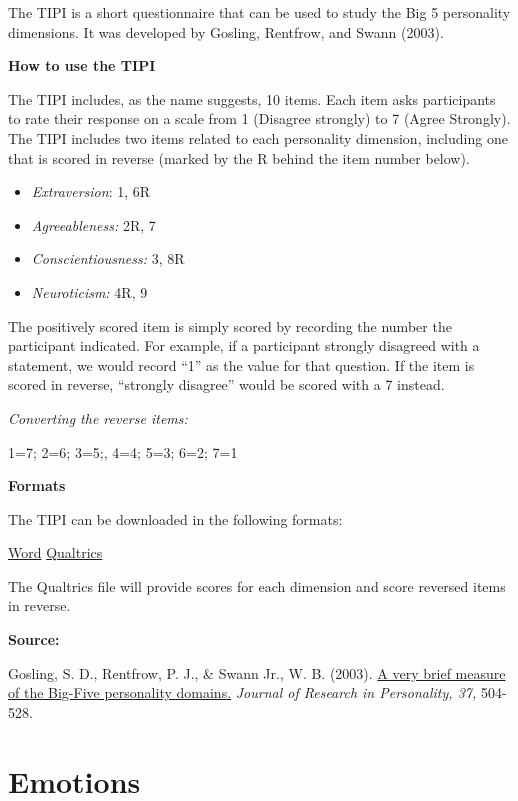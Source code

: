 \documentclass[
]{book}
\providecommand{\tightlist}{%
  \setlength{\itemsep}{0pt}\setlength{\parskip}{0pt}}
\begin{document}
The TIPI is a short questionnaire that can be used to study the Big 5 personality dimensions. It was developed by Gosling, Rentfrow, and Swann (2003).

\textbf{How to use the TIPI}

The TIPI includes, as the name suggests, 10 items. Each item asks participants to rate their response on a scale from 1 (Disagree strongly) to 7 (Agree Strongly). The TIPI includes two items related to each personality dimension, including one that is scored in reverse (marked by the R behind the item number below).

\begin{itemize}
\tightlist
\item
  \emph{Extraversion}: 1, 6R
\item
  \emph{Agreeableness:} 2R, 7
\item
  \emph{Conscientiousness:} 3, 8R
\item
  \emph{Neuroticism:} 4R, 9
\end{itemize}

The positively scored item is simply scored by recording the number the participant indicated. For example, if a participant strongly disagreed with a statement, we would record ``1'' as the value for that question. If the item is scored in reverse, ``strongly disagree'' would be scored with a 7 instead.

\emph{Converting the reverse items:}

1=7; 2=6; 3=5;, 4=4; 5=3; 6=2; 7=1

\textbf{Formats}

The TIPI can be downloaded in the following formats:

\href{questionnaires/10-ItemPersonalityInventory_TIPI.docx}{Word} \textbar{} \href{questionnaires/10-ItemPersonalityInventory_TIPI.qsf}{Qualtrics}

The Qualtrics file will provide scores for each dimension and score reversed items in reverse.

\textbf{Source:}

Gosling, S. D., Rentfrow, P. J., \& Swann Jr., W. B. (2003). \href{http://citeseerx.ist.psu.edu/viewdoc/download?doi=10.1.1.113.6704\&rep=rep1\&type=pdf}{A very brief measure of the Big-Five personality domains.} \emph{Journal of Research in Personality, 37,} 504-528.

\hypertarget{emotions}{%
\section{Emotions}\label{emotions}}
\end{document}
